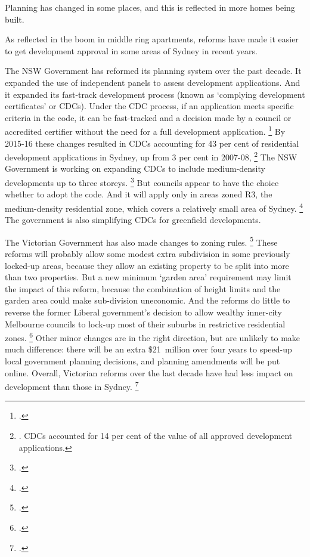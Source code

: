 Planning has changed in some places, and this is reflected in more homes being built. 

As reflected in the boom in middle ring apartments, reforms have made it easier to
get development approval in some areas of Sydney in recent years.

The NSW Government has reformed its planning system over the past decade.
It expanded the use of independent panels to assess development applications.
And it expanded its fast-track development process (known as `complying development certificates' or CDCs).
Under the CDC process, if an application meets specific criteria in the code, it can be fast-tracked and a decision made by a council or accredited certifier without the need for a full development application.%
    \footcites{NSW-2015-Planning-Complying-date}{NSWDPE2017ihaps}{NSWGovFirstHome2017}{Stokes2017HousingSupply}
By 2015-16 these changes resulted in CDCs accounting for 43 per cent of residential development applications in Sydney, up from 3 per cent in 2007-08,%
    \footnote{\textcites{NSW_OEH_2018_local_development_performance}[][27]{PC-2017-shifting-dial-potential-of-land}. CDCs accounted for 14 per cent of the value of all approved development applications.}
The NSW Government is working on expanding CDCs to include medium-density developments up to three storeys.%
	\footcite{NSWGovFirstHome2017}
But councils appear to have the choice whether to adopt the code.
And it will apply only in areas zoned R3, the medium-density residential zone, which covers a relatively small area of Sydney.%
	\footcite{PWC2017sydneyaffordabilitycrisis}
The government is also simplifying CDCs for greenfield developments.

The Victorian Government has also made changes to zoning rules.%
    \footcite[][Policy~2.4.2.]{VicGov2017PlanMelb}
These reforms will probably allow some modest extra subdivision in some previously locked-up areas, because they allow an existing property to be split into more than two properties.
But a new minimum `garden area' requirement may limit the impact of this reform, because the combination of height limits and the garden area could make sub-division uneconomic.
And the reforms do little to reverse the former Liberal government's decision to allow wealthy inner-city Melbourne councils to lock-up most of their suburbs in restrictive residential zones.%
	\footcite{VICDepEnvironLWP2017}
Other minor changes are in the right direction, but are unlikely to make much difference: there will be an extra \$21~million over four years to speed-up local government planning decisions, and planning amendments will be put online.
Overall, Victorian reforms over the last decade have had less impact on development than those in Sydney.%
    \footnote{.}


